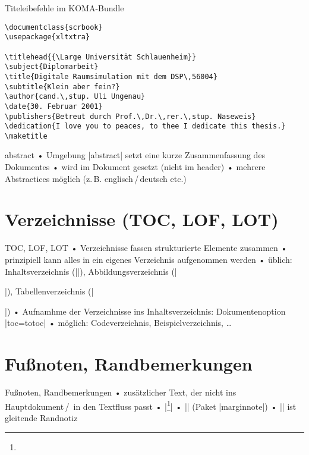 \begin{frame}[fragile]
\begin{block}{Titeleibefehle im KOMA-Bundle}
\begin{verbatim}
\documentclass{scrbook}
\usepackage{xltxtra}

\titlehead{{\Large Universität Schlauenheim}}
\subject{Diplomarbeit}
\title{Digitale Raumsimulation mit dem DSP\,56004}
\subtitle{Klein aber fein?}
\author{cand.\,stup. Uli Ungenau}
\date{30. Februar 2001}
\publishers{Betreut durch Prof.\,Dr.\,rer.\,stup. Naseweis}
\dedication{I love you to peaces, to thee I dedicate this thesis.}
\maketitle

\end{verbatim}
\end{block}
\end{frame}

\begin{frame}{abstract}
• Umgebung |abstract| setzt eine kurze Zusammenfassung des Dokumentes
• wird im Dokument gesetzt (nicht im header)
• mehrere Abstractices möglich (z.\,B. englisch\,/\,deutsch etc.)
\•
\end{frame}

\section{Verzeichnisse (TOC, LOF, LOT)}
\begin{frame}[fragile]{TOC, LOF, LOT}
• Verzeichnisse fassen strukturierte Elemente zusammen
• prinzipiell kann alles in ein eigenes Verzeichnis aufgenommen werden
• üblich: Inhaltsverzeichnis (|\tableofcontents|), Abbildungsverzeichnis (|\listoffigures|), Tabellenverzeichnis (|\listoftables|)
• Aufnamhme der Verzeichnisse ins Inhaltsverzeichnis: Dokumentenoption |toc=totoc|
• möglich: Codeverzeichnis, Beispielverzeichnis, …
\• 
\end{frame}

\section{Fußnoten, Randbemerkungen}
\begin{frame}[fragile]{Fußnoten, Randbemerkungen}
• zusätzlicher Text, der nicht ins Hauptdokument\,/\, in den Textfluss passt
• |\footnote{}|
• |\marginnote| (Paket |marginnote|)
• |\marginpar| ist gleitende Randnotiz
\•
\end{frame}

